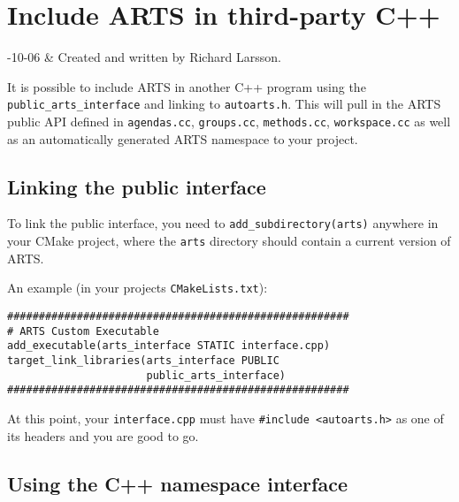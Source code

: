 \chapter{Include ARTS in third-party C++}
\label{sec:cpp_api}

-10-06 & Created and written by Richard Larsson.\\
\stophistory

%
%

It is possible to include ARTS in another C++ program using
the \verb|public_arts_interface| and linking to \verb|autoarts.h|.
This will pull in the ARTS public API defined in \verb|agendas.cc|,
\verb|groups.cc|, \verb|methods.cc|, \verb|workspace.cc| as well
as an automatically generated ARTS namespace to your project.


\section{Linking the public interface}
\label{sec:cpp_api:public_linking}

To link the public interface, you need to \verb|add_subdirectory(arts)|
anywhere in your CMake project, where the \verb|arts| directory should contain
a current version of ARTS.

An example (in your projects \verb|CMakeLists.txt|):
\begin{verbatim}
######################################################
# ARTS Custom Executable
add_executable(arts_interface STATIC interface.cpp)
target_link_libraries(arts_interface PUBLIC
                      public_arts_interface)
######################################################
\end{verbatim}

At this point, your \verb|interface.cpp| must have
\verb|#include <autoarts.h>| as one of its headers
and you are good to go.

\section{Using the C++ namespace interface}
\label{sec:cpp_api:usage}

